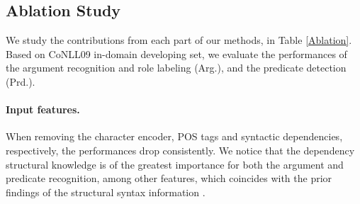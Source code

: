 \documentclass[letterpaper]{article} \usepackage{aaai21}  \usepackage{times}  \usepackage{helvet} \usepackage{courier}  \usepackage[hyphens]{url}  \usepackage{graphicx} \urlstyle{rm} \def\UrlFont{\rm}  \usepackage{natbib}  \usepackage{caption}
\begin{document}
\begin{CJK}{UTF8}{gbsn}
\begin{table}[!t]
\begin{center}
\end{center}
  \caption{
  Ablation results (F1 score).
  }
  \label{Ablation}
\end{table}





\subsection{Ablation Study}
We study the contributions from each part of our methods, in Table \ref{Ablation}.
Based on CoNLL09 in-domain developing set, we evaluate the performances of the argument recognition and role labeling (Arg.), and the predicate detection (Prd.).



\paragraph{Input features.}
When removing the character encoder, POS tags and syntactic dependencies, respectively, the performances drop consistently.
We notice that the dependency structural knowledge is of the greatest importance for both the argument and predicate recognition, among other features, which coincides with the prior findings of the structural syntax information \cite{marcheggiani-etal-2017-simple,zhang-etal-2019-syntax-enhanced,Crossfei9165903}.





\end{CJK}
\end{document}
